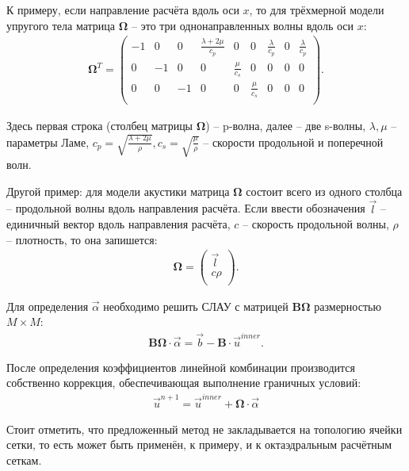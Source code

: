\documentclass[a4paper]{article}
\numberwithin{equation}{section}
\begin{document}
К примеру, если направление расчёта вдоль оси $x$, то 
для трёхмерной модели упругого тела матрица $\mathbf{\Omega}$ -- 
это три однонаправленных волны вдоль оси $x$:
\begin{align}
\label{Omega_for_elastic3D}
	\mathbf{\Omega}^T =
	\left( \begin{array}{cccccccccccc}
	-1 & 0 & 0 & \frac{\lambda+2\mu}{c_p} & 0 & 0 & \frac{\lambda}{c_p} & 0 & \frac{\lambda}{c_p} \\
	0 & -1 & 0 & 0 & \frac{\mu}{c_s} & 0 & 0 & 0 & 0 \\
	0 & 0 & -1 & 0 & 0 & \frac{\mu}{c_s} & 0 & 0 & 0 \\
	\end{array} \right).
\end{align} 

Здесь первая строка (столбец матрицы $\mathbf{\Omega}$) -- p-волна, далее -- две s-волны, 
$\lambda, \mu$ -- параметры Ламе, 
$c_p = \sqrt{\frac{\lambda + 2\mu}{\rho}}, c_s = \sqrt{\frac{\mu}{\rho}}$ -- 
скорости продольной и поперечной волн.

Другой пример: для модели акустики матрица $\mathbf{\Omega}$ состоит 
всего из одного столбца -- продольной волны вдоль направления расчёта. 
Если ввести обозначения $\vec{l}$ -- единичный вектор вдоль направления расчёта,
$c$ -- скорость продольной волны, $\rho$ -- плотность, то она запишется:
\begin{align}
\label{Omega_for_acoustic}
	\mathbf{\Omega} =
	\left( \begin{array}{cccccccccccc}
	 \vec{l} \\
	 c \rho \\
	\end{array} \right).
\end{align} 

Для определения $\vec{\alpha}$ необходимо решить 
СЛАУ с матрицей $\mathbf{B} \mathbf{\Omega}$ размерностью $M \times M$:
\begin{eqnarray}
\label{SLE_on_alpha}
	\mathbf{B} \mathbf{\Omega} \cdot \vec{\alpha} = \vec{b} - \mathbf{B} \cdot \vec{u}^{inner}.
\end{eqnarray}

После определения коэффициентов линейной комбинации производится собственно коррекция,
обеспечивающая выполнение граничных условий:
\begin{eqnarray}
\vec{u}^{n+1} = \vec{u}^{inner} + \mathbf{\Omega} \cdot \vec{\alpha}
\end{eqnarray}

Стоит отметить, что предложенный метод 
не закладывается на топологию ячейки сетки, то есть может быть применён, 
к примеру, и к октаэдральным расчётным сеткам.
\end{document}
